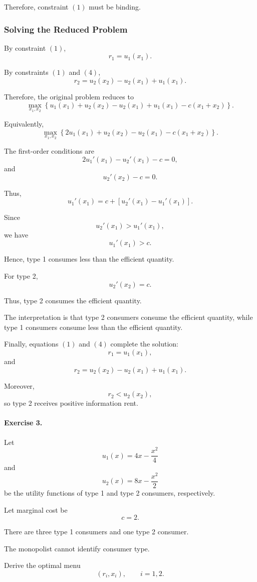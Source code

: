 Therefore, constraint \((1)\) must be binding.

\subsubsection{Solving the Reduced Problem}

By constraint \((1)\),
\[
r_1=u_1(x_1).
\]

By constraints \((1)\) and \((4)\),
\[
r_2
=
u_2(x_2)-u_2(x_1)+u_1(x_1).
\]

Therefore, the original problem reduces to
\[
\max_{x_1,x_2}
\left\{
u_1(x_1)
+
u_2(x_2)
-
u_2(x_1)
+
u_1(x_1)
-
c(x_1+x_2)
\right\}.
\]

Equivalently,
\[
\max_{x_1,x_2}
\left\{
2u_1(x_1)
+
u_2(x_2)
-
u_2(x_1)
-
c(x_1+x_2)
\right\}.
\]

The first-order conditions are
\[
2u_1'(x_1)-u_2'(x_1)-c=0,
\]
and
\[
u_2'(x_2)-c=0.
\]

Thus,
\[
u_1'(x_1)
=
c+\left[u_2'(x_1)-u_1'(x_1)\right].
\]

Since
\[
u_2'(x_1)>u_1'(x_1),
\]
we have
\[
u_1'(x_1)>c.
\]

Hence, type 1 consumes less than the efficient quantity.

For type 2,
\[
u_2'(x_2)=c.
\]

Thus, type 2 consumes the efficient quantity.

The interpretation is that type 2 consumers consume the efficient quantity, while type 1 consumers consume less than the efficient quantity.

Finally, equations \((1)\) and \((4)\) complete the solution:
\[
r_1=u_1(x_1),
\]
and
\[
r_2
=
u_2(x_2)-u_2(x_1)+u_1(x_1).
\]

Moreover,
\[
r_2<u_2(x_2),
\]
so type 2 receives positive information rent.

\paragraph{Exercise 3.}

Let
\[
u_1(x)=4x-\frac{x^2}{4}
\]
and
\[
u_2(x)=8x-\frac{x^2}{2}
\]
be the utility functions of type 1 and type 2 consumers, respectively.

Let marginal cost be
\[
c=2.
\]

There are three type 1 consumers and one type 2 consumer.

The monopolist cannot identify consumer type.

Derive the optimal menu
\[
(r_i,x_i),
\qquad
i=1,2.
\]

